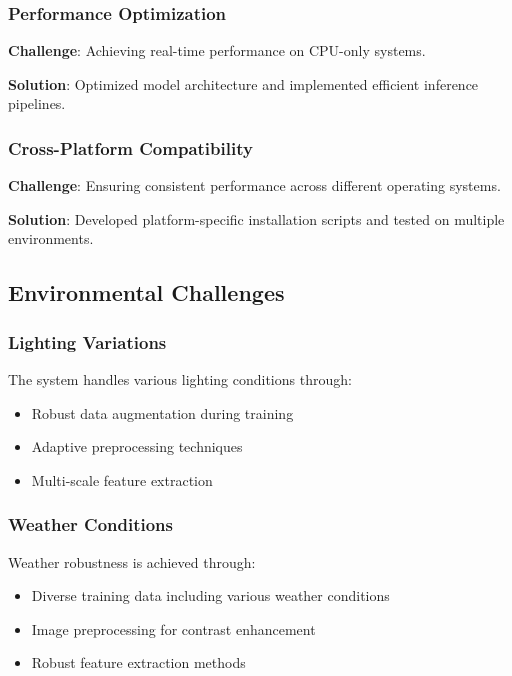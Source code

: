 \documentclass[12pt,a4paper]{article}
\begin{document}
\subsubsection{Performance Optimization}

\textbf{Challenge}: Achieving real-time performance on CPU-only systems.

\textbf{Solution}: Optimized model architecture and implemented efficient inference pipelines.

\subsubsection{Cross-Platform Compatibility}

\textbf{Challenge}: Ensuring consistent performance across different operating systems.

\textbf{Solution}: Developed platform-specific installation scripts and tested on multiple environments.

\subsection{Environmental Challenges}

\subsubsection{Lighting Variations}

The system handles various lighting conditions through:

\begin{itemize}
    \item Robust data augmentation during training
    \item Adaptive preprocessing techniques
    \item Multi-scale feature extraction
\end{itemize}

\subsubsection{Weather Conditions}

Weather robustness is achieved through:

\begin{itemize}
    \item Diverse training data including various weather conditions
    \item Image preprocessing for contrast enhancement
    \item Robust feature extraction methods
\end{itemize}
\end{document}
